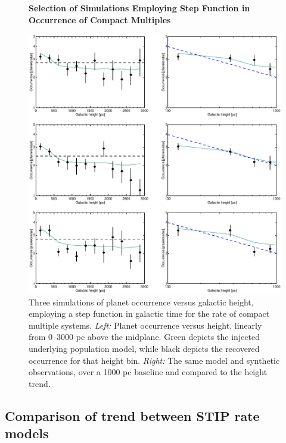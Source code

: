 \documentclass[twocolumn]{aastex631}
\begin{document}
\begin{figure}
    \centering
    \textbf{Selection of Simulations Employing Step Function in Occurrence of Compact Multiples}\par\medskip
    \includegraphics[trim={0.5cm 0 0.5cm 0}, width=6.0in]{figures/occurrence_height_kepler_step.eps}
    \caption{Three simulations of planet occurrence versus galactic height, employing a step function in galactic time for the rate of compact multiple systems. \textit{Left:} Planet occurrence versus height, linearly from 0--3000 pc above the midplane. Green depicts the injected underlying population model, while black depicts the recovered occurrence for that height bin. \textit{Right:} The same model and synthetic observations, over a 1000 pc baseline and compared to the \cite{zink_scaling_2023} height trend.}
    \label{fig:step_iterations}
\end{figure}

\subsection{Comparison of trend between STIP rate models}
\label{sec:compare_to_models}
\end{document}
